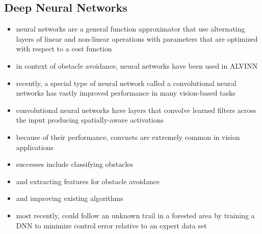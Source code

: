 \documentclass[paper=a4, fontsize=11pt]{scrartcl} %
\begin{document}
	\subsection{Deep Neural Networks}
	\begin{itemize}
		\item neural networks are a general function approximator that use alternating layers of linear and non-linear operations with parameters that are optimized with respect to a cost function
		\item in context of obstacle avoidance, neural networks have been used in ALVINN \cite{Pomerleau1989,Michels2005,riedmiller2009reinforcement}
		\item recently, a special type of neural network called a convolutional neural networks \cite{DBLP:journals/corr/SzegedyLJSRAEVR14} has vastly improved performance in many vision-based tasks
		\item convolutional neural networks have layers that convolve learned filters across the input producing spatially-aware activations
		\item because of their performance, convnets are extremely common in vision applications
		\item successes include classifying obstacles \cite{Hadsell2009} 
		\item and extracting features for obstacle avoidance
		\item and improving existing algorithms \cite{Kim2015}
		\item most recently, \cite{Guisti2016} could follow an unknown trail in a forested area by training a DNN to minimize control error relative to an expert data set
	\end{itemize}
\end{document}
